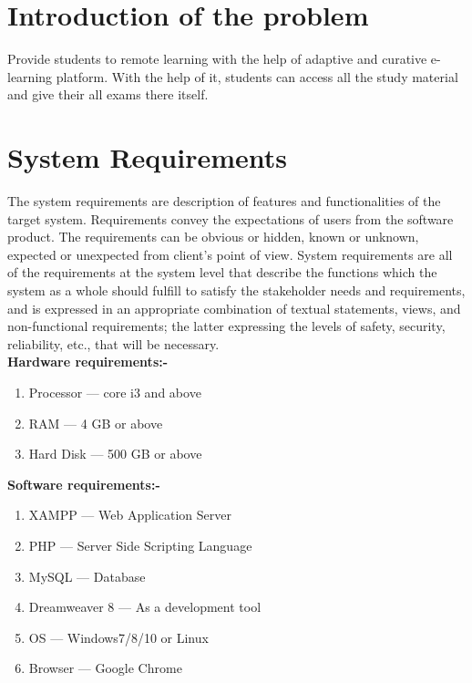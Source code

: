 \section{Introduction of the problem}
Provide students to remote learning with the help of adaptive and curative e-learning platform. With the help of it, students can access all the study material and give their all exams there itself.
\section{System Requirements}
The system requirements are description of features and functionalities of the target system. Requirements convey the expectations of users from the software product. The requirements can be obvious or hidden, known or unknown, expected or unexpected from client’s point of view. System requirements are all of the requirements at the system level that describe the functions which the system as a whole should fulfill to satisfy the stakeholder needs and requirements, and is expressed in an appropriate combination of textual statements, views, and non-functional requirements; the latter expressing the levels of safety, security, reliability, etc., that will be necessary.\\[0.5cm]
\textbf{Hardware requirements:-}
\begin{enumerate}
	\item Processor --- core i3 and above
	\item RAM --- 4 GB or above
	\item Hard Disk --- 500 GB or above
\end{enumerate}
\textbf{Software requirements:-}
\begin{enumerate}
	\item XAMPP --- Web Application Server
	\item PHP --- Server Side Scripting Language
	\item MySQL --- Database
	\item Dreamweaver 8 --- As a development tool
	\item OS --- Windows7/8/10 or Linux
	\item Browser --- Google Chrome
\end{enumerate}
